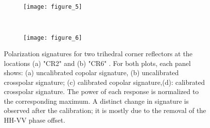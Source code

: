 \begin{figure}[Ht!]
	\centering
	\begin{subfigure}[t]{\columnwidth}
	\centering
	\texttt{[image: figure\_5]}
	\label{fig:signatures:near}
	\end{subfigure}\\
	\begin{subfigure}[t]{\columnwidth}
	\centering
	\texttt{[image: figure\_6]}
	\label{fig:signatures:far}
	\end{subfigure}
	\caption{Polarization signatures for two trihedral corner reflectors at the locations (a) "CR2" and (b) "CR6" . For both plots, each panel shows: (a) uncalibrated copolar signature, (b) uncalibrated crosspolar signature; (c) calibrated copolar signature,(d): calibrated crosspolar signature. The power of each response is normalized to the corresponding maximum. A distinct change in signature is observed after the calibration; it is mostly due to the removal of the HH-VV phase offset.}
	\label{fig:signatures}
\end{figure}

